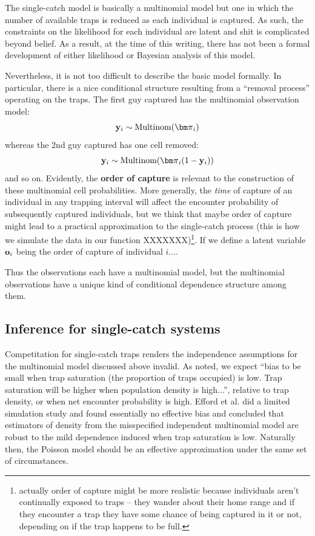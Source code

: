 The single-catch model is basically a multinomial model but one in
which the number of available traps is reduced as each individual is
captured. As such, the constraints on the likelihood for each
individual are latent and shit is complicated beyond belief.  As a
result, at the time of this writing, there has not been a formal
development of either likelihood or Bayesian analysis of this model.

Nevertheless, it is not too difficult to describe the basic model
formally. In particular, there is a nice conditional structure
resulting from a ``removal process'' operating on the traps.  The
first guy captured has the multinomial observation model:
\[
{\bf y}_{i} \sim \mbox{Multinom}({\bm \pi}_{i})
\]
whereas the 2nd guy captured has one cell removed:
\[
{\bf y}_{i} \sim \mbox{Multinom}({\bm \pi}_{i}(1-{\bf y}_{i})    )
\]
and so on.  Evidently, the {\bf order of capture} is relevant to the
construction of these multinomial cell probabilities. More generally,
the {\it time} of capture of an individual in any trapping interval
will affect the encounter probability of subsequently captured
individuals, but we think that maybe order of capture might lead to a
practical approximation to the single-catch process (this is how we
simulate the data in our function XXXXXXX)\footnote{actually order of
  capture might be more realistic because individuals aren't
  continually exposed to traps -- they wander about their home range
  and if they encounter a trap they have some chance of being captured
  in it or not, depending on if the trap happens to be full. }.  If we
define a latent variable ${\bf o}_{i}$ being the order of capture of
individual $i$....

Thus the observations each have a multinomial model, but the
multinomial observations have a unique kind of conditional dependence
structure among them.

\subsection{Inference for single-catch systems}

Competitation for single-catch traps renders the independence
assumptions for the multinomial model discussed above invalid.  As
\citet{efford_etal:2009euring} noted, we expect ``bias to be small
when trap saturation (the proportion of traps occupied) is low.  Trap
saturation will be higher when population density is high...'',
relative to trap density, or when net encounter probability is high.
Efford et al. did a limited simulation study and found essentially no
effective bias and concluded that estimators of density from the
misspecified independent multinomial model are robust to the mild
dependence induced when trap saturation is low.  Naturally then, the
Poisson model should be an effective approximation under the same set
of circumstances.

